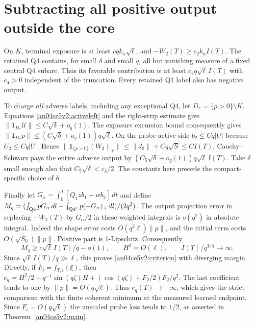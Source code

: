 \documentclass[11pt]{article}
\newcommand{\dd}{\,dl}
\newcommand{\dt}{\,dt}
\newcommand{\norm}[1]{\lVert #1\rVert}
\begin{document}
\section{Subtracting all positive output outside the core}\label{an04ce5v2:endpoint}
On $K$, terminal exposure is at least $c q k_\alpha\sqrt\ell$, and
$-W_2(T)\ge c_2 k_\alpha I(T)$. The retained Q4 contains, for small
$\delta$ and small $q$, all but vanishing measure of a fixed central
Q4 subarc. Thus its favorable contribution is at least
$c_4 q\sqrt\ell\,I(T)$ with $c_4>0$ independent of the truncation.
Every retained Q1 label also has negative output.

To charge \emph{all} adverse labels, including any exceptional Q4,
let $D_*=\{p>0\}\setminus K$. Equations \eqref{an04ce5v2:activeleft} and
the right-strip estimate give
$\norm{\mathbf1_{D_*}\mathcal U}\le C\sqrt\delta+o_q(1)$.
The exposure excursion bound consequently gives
$\norm{\mathbf1_{D_*}p}\le(C\sqrt\delta+o_q(1))q\sqrt\ell$.
On the probe-active side $b_2\le Cq|U|$ because $U_2\le Cq|U|$.
Hence $\norm{\mathbf1_{\{p>0\}}(W_2)_+}\le\norm{d_2}+Cq\sqrt S
\le C I(T)$. Cauchy--Schwarz pays the entire adverse output by
$(C_5\sqrt\delta+o_q(1))q\sqrt\ell\,I(T)$.
Take $\delta$ small enough also that $C_5\sqrt\delta<c_4/2$.
The constants here precede the compact-specific choice of $b$.

Finally let $G_\alpha=\int_0^T[Q_1zb_1-w b_2]\dt$ and define
$M_q=(\int_{\rm Q4}pG_\alpha\dd-\int_{{\rm Q4}^c}p(-G_\alpha)_+\dd)/(2q^2)$.
The output projection error in replacing $-W_2(T)$ by $G_\alpha/2$
in these weighted integrals is $o(q^2)$ in absolute integral. Indeed
the shape error costs $O(q^2\ell)\norm p$, and the initial term costs
$O(\sqrt{S_0})\norm p$. Positive part is 1-Lipschitz. Consequently
\[
 M_q\ge c\sqrt\ell\, I(T)/q-o(1),\qquad
 H^2=O(\ell),\qquad I(T)/q^{3/4}\longrightarrow\infty .
\]
Since $\sqrt\ell\,I(T)/q\gg\ell$, this proves \eqref{an04ce5v2:criterion} with diverging margin. Directly, if
$F_i=f_{T,i}(\xi)$, then
$e_q=H^2/2-q^{-1}\sin(q\zeta)H+
(\cos(q\zeta)+F_2/2)F_2/q^2$.
The last coefficient tends to one by $\norm p=O(q\sqrt\ell)$.
Thus $e_q(T)\to-\infty$, which gives the strict comparison with
the finite coherent minimum at the measured learned endpoint. Since $F_i=O(q\sqrt\ell)$ the unscaled probe loss tends to $1/2$, as asserted in Theorem~\ref{an04ce5v2:main}.
\end{document}
